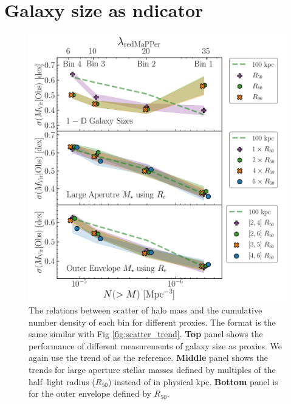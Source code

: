 \documentclass[fleqn,usenatbib,useAMS,english]{mnras}
\begin{document}
\section{Galaxy size as \texorpdfstring{\mvir{}} indicator}
	\label{app:size}


  \begin{figure}
      \centering
      \includegraphics[width=13cm]{figure/topn_fig_appendix_2}
      \caption{
          The relations between scatter of halo mass and the cumulative number density of each
          \topn{} bin for different \mhalo{} proxies.
          The format is the same similar with Fig \ref{fig:scatter_trend}.
          \textbf{Top} panel shows the performance of different measurements of galaxy size as
          \mhalo{} proxies.
          We again use the trend of  as the reference.
          \textbf{Middle} panel shows the trends for large aperture stellar masses defined by
          multiples of the half--light radius ($R_{50}$) instead of in physical kpc.
          \textbf{Bottom} panel is for the outer envelope \mstar{} defined by $R_{50}$.
      }
      \label{fig:scatter_trend_2}
  \end{figure}
\end{document}
